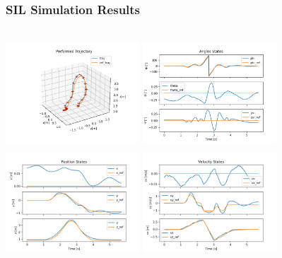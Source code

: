 \documentclass{thesisbeamer}
\begin{document}
\begin{frame}
	\frametitle{SIL Simulation Results}

	\begin{columns}[t]
		\centering
			\includegraphics[width=5cm,height=4cm]{Images/sil_simulations/performedTraj.png}
			\includegraphics[width=5cm,height=4cm]{Images/sil_simulations/angleStates.png}
			\centering
			\includegraphics[width=5cm,height=4cm]{Images/sil_simulations/posStates.png}
			\includegraphics[width=5cm,height=4cm]{Images/sil_simulations/velStates.png}
	\end{columns}	
	
\end{frame}
		
\end{document}
